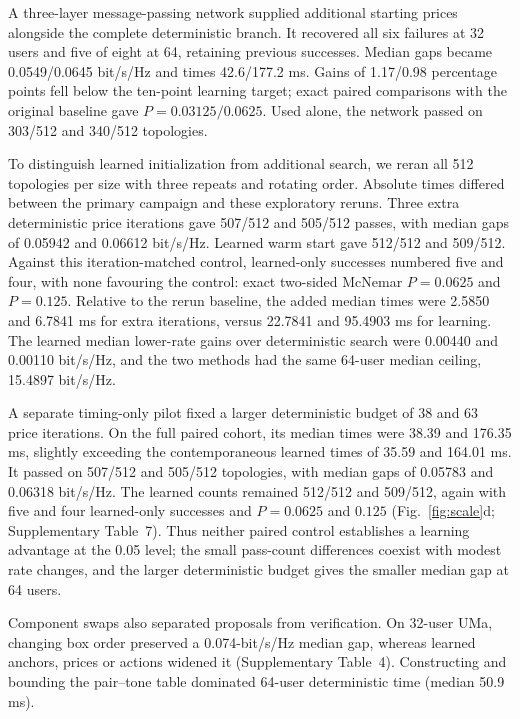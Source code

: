 \documentclass[lineno,pdflatex,sn-nature]{sn-jnl}
\begin{document}
A three-layer message-passing network supplied additional starting prices alongside the complete deterministic branch. It recovered all six failures at 32 users and five of eight at 64, retaining previous successes. Median gaps became 0.0549/0.0645 bit/s/Hz and times 42.6/177.2 ms. Gains of 1.17/0.98 percentage points fell below the ten-point learning target; exact paired comparisons with the original baseline gave \(P=0.03125/0.0625\). Used alone, the network passed on 303/512 and 340/512 topologies.

To distinguish learned initialization from additional search, we reran all 512 topologies per size with three repeats and rotating order. Absolute times differed between the primary campaign and these exploratory reruns. Three extra deterministic price iterations gave 507/512 and 505/512 passes, with median gaps of 0.05942 and 0.06612 bit/s/Hz. Learned warm start gave 512/512 and 509/512. Against this iteration-matched control, learned-only successes numbered five and four, with none favouring the control: exact two-sided McNemar \(P=0.0625\) and \(P=0.125\). Relative to the rerun baseline, the added median times were 2.5850 and 6.7841 ms for extra iterations, versus 22.7841 and 95.4903 ms for learning. The learned median lower-rate gains over deterministic search were 0.00440 and 0.00110 bit/s/Hz, and the two methods had the same 64-user median ceiling, 15.4897 bit/s/Hz.


A separate timing-only pilot fixed a larger deterministic budget of 38 and 63 price iterations. On the full paired cohort, its median times were 38.39 and 176.35 ms, slightly exceeding the contemporaneous learned times of 35.59 and 164.01 ms. It passed on 507/512 and 505/512 topologies, with median gaps of 0.05783 and 0.06318 bit/s/Hz. The learned counts remained 512/512 and 509/512, again with five and four learned-only successes and \(P=0.0625\) and \(0.125\) (Fig.~\ref{fig:scale}d; Supplementary Table~7). Thus neither paired control establishes a learning advantage at the 0.05 level; the small pass-count differences coexist with modest rate changes, and the larger deterministic budget gives the smaller median gap at 64 users.


Component swaps also separated proposals from verification. On 32-user UMa, changing box order preserved a 0.074-bit/s/Hz median gap, whereas learned anchors, prices or actions widened it (Supplementary Table~4). Constructing and bounding the pair--tone table dominated 64-user deterministic time (median 50.9 ms).
\end{document}
